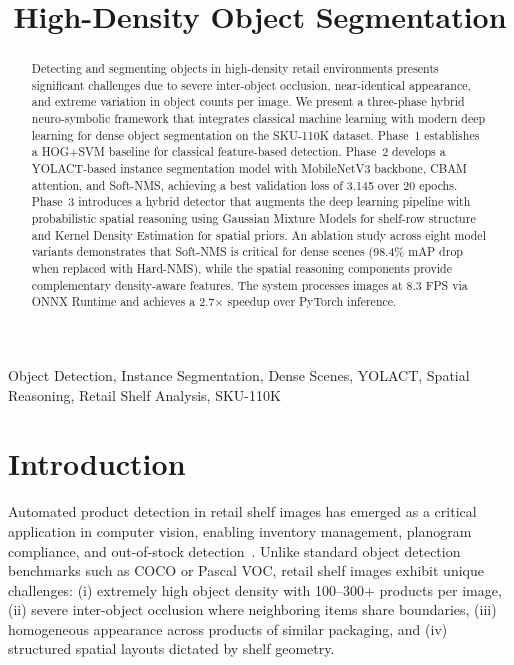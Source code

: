 \documentclass[conference]{IEEEtran}
\title{High-Density Object Segmentation}
\author{
  \IEEEauthorblockN{Siddhartha Shukla}
  \IEEEauthorblockA{
    Enrollment No: 230104\\
    Department of Computer Science
  }
  \and
  \IEEEauthorblockN{Harsh Gupta}
  \IEEEauthorblockA{
    Enrollment No: 230093\\
    Department of Computer Science
  }
}
\begin{document}
\maketitle

\begin{abstract}
Detecting and segmenting objects in high-density retail environments presents
significant challenges due to severe inter-object occlusion, near-identical
appearance, and extreme variation in object counts per image. We present a
three-phase hybrid neuro-symbolic framework that integrates classical machine
learning with modern deep learning for dense object segmentation on the
SKU-110K dataset. Phase~1 establishes a HOG+SVM baseline for classical
feature-based detection. Phase~2 develops a YOLACT-based instance segmentation
model with MobileNetV3 backbone, CBAM attention, and Soft-NMS, achieving a best
validation loss of 3.145 over 20 epochs. Phase~3 introduces a hybrid detector
that augments the deep learning pipeline with probabilistic spatial reasoning
using Gaussian Mixture Models for shelf-row structure and Kernel Density
Estimation for spatial priors. An ablation study across eight model variants
demonstrates that Soft-NMS is critical for dense scenes (98.4\% mAP drop when
replaced with Hard-NMS), while the spatial reasoning components provide
complementary density-aware features. The system processes images at 8.3 FPS
via ONNX Runtime and achieves a 2.7$\times$ speedup over PyTorch inference.
\end{abstract}

\begin{IEEEkeywords}
Object Detection, Instance Segmentation, Dense Scenes, YOLACT, Spatial
Reasoning, Retail Shelf Analysis, SKU-110K
\end{IEEEkeywords}

\section{Introduction}
\label{sec:intro}

Automated product detection in retail shelf images has emerged as a critical
application in computer vision, enabling inventory management, planogram
compliance, and out-of-stock detection~\cite{goldman2019sku110k}. Unlike
standard object detection benchmarks such as COCO or Pascal VOC, retail shelf
images exhibit unique challenges: (i) extremely high object density with
100--300+ products per image, (ii) severe inter-object occlusion where
neighboring items share boundaries, (iii) homogeneous appearance across products
of similar packaging, and (iv) structured spatial layouts dictated by shelf
geometry.
\end{document}
